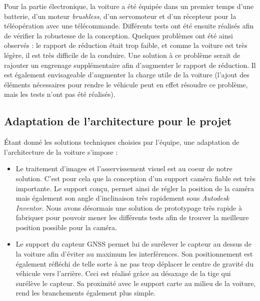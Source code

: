 \documentclass[12pt, openany]{report}
\begin{document}
Pour la partie électronique, la voiture a été équipée dans un premier temps d'une batterie, d'un moteur \textit{brushless}, d'un servomoteur et d'un récepteur pour la téléopération avec une télécommande. Différents tests ont été ensuite réalisés afin de vérifier la robustesse de la conception. Quelques problèmes ont été ainsi observés : le rapport de réduction était trop faible, et comme la voiture est très légère, il est très difficile de la conduire. Une solution à ce problème serait de rajouter un engrenage supplémentaire afin d'augmenter le rapport de réduction. Il est également envisageable d'augmenter la charge utile de la voiture (l'ajout des éléments nécessaires pour rendre le véhicule peut en effet résoudre ce problème, mais les tests n'ont pas été réalisés).\\

\subsection{Adaptation de l'architecture pour le projet}
Étant donné les solutions techniques choisies par l'équipe, une adaptation de l'architecture de la voiture s'impose :
\begin{itemize}[label=\textbullet, font=\small]
    \item Le traitement d'images et l'asservissement visuel est au coeur de notre solution. C'est pour cela que la conception d'un support caméra fiable est très importante. Le support conçu, permet ainsi de régler la position de la caméra mais également son angle d'inclinaison très rapidement sous \textit{Autodesk Inventor}. Nous avons désormais une solution de prototypage très rapide à fabriquer pour pouvoir mener les différents tests afin de trouver la meilleure position possible pour la caméra.
    \item Le support du capteur \textsc{GNSS} permet lui de surélever le capteur au dessus de la voiture afin d'éviter au maximum les interférences. Son positionnement est également réfléchi de telle sorte à ne pas trop déplacer le centre de gravité du véhicule vers l'arrière. Ceci est réalisé grâce au désaxage de la tige qui surélève le capteur. Sa proximité avec le support carte au milieu de la voiture, rend les branchements également plus simple.\\
\end{itemize}
\end{document}
